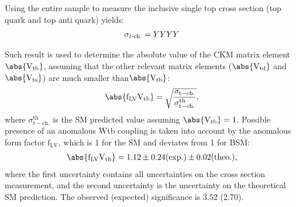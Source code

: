 



%

Using the entire sample to measure the inclusive single top cross section (top quark and top anti quark) yields:
\begin{eqnarray}
\sigma_{t\textrm{-ch.}} =YYYY
\end{eqnarray}



Such result is used to determine the absolute value of the CKM matrix element $\abs{\mathrm{V_{tb}}}$, assuming that the other relevant matrix elements ($\abs{\mathrm{V_{td}}}$ and $\abs{\mathrm{V_{ts}}}$) are much smaller than$\abs{\mathrm{V_{tb}}}$:
\begin{eqnarray}
\mathrm{\abs{f_{LV}V_{tb}}} = \sqrt{\frac{\sigma_{\mathrm{t-ch.}}}{{\sigma^{\mathrm{th}}_{\mathrm{t-ch.}}}}},
\end{eqnarray}
where $\sigma_{\mathrm{t-ch.}}^{\mathrm{th}}$ is the SM predicted value assuming $\abs{\mathrm{V_{tb}}} = 1$. Possible presence of an anomalous Wtb coupling is taken into account by the anomalous form factor $\mathrm{f_{LV}}$, which is 1 for the SM and deviates from 1 for BSM:
\begin{eqnarray}
\mathrm{\abs{f_{LV}V_{tb}}} = \vtbobs \pm \vtbobsexp (\mathrm{exp.}) \pm \vtbobstheo (\mathrm{theo.}),
\end{eqnarray}
where the first uncertainty contains all uncertainties on the cross section measurement, and the second uncertainty is the uncertainty on the theoretical SM prediction.
The observed (expected) significance is 3.52 (2.70).
